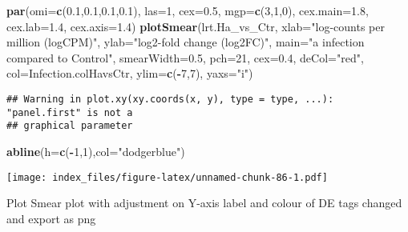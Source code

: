 \documentclass[
]{article}
\newenvironment{Shaded}{\begin{snugshade}}{\end{snugshade}}
\newcommand{\AttributeTok}[1]{\textcolor[rgb]{0.13,0.29,0.53}{#1}}
\newcommand{\DecValTok}[1]{\textcolor[rgb]{0.00,0.00,0.81}{#1}}
\newcommand{\FloatTok}[1]{\textcolor[rgb]{0.00,0.00,0.81}{#1}}
\newcommand{\FunctionTok}[1]{\textcolor[rgb]{0.13,0.29,0.53}{\textbf{#1}}}
\newcommand{\NormalTok}[1]{#1}
\newcommand{\SpecialCharTok}[1]{\textcolor[rgb]{0.81,0.36,0.00}{\textbf{#1}}}
\newcommand{\StringTok}[1]{\textcolor[rgb]{0.31,0.60,0.02}{#1}}
\begin{document}
\begin{Shaded}
\begin{Highlighting}[]
\FunctionTok{par}\NormalTok{(}\AttributeTok{omi=}\FunctionTok{c}\NormalTok{(}\FloatTok{0.1}\NormalTok{,}\FloatTok{0.1}\NormalTok{,}\FloatTok{0.1}\NormalTok{,}\FloatTok{0.1}\NormalTok{), }\AttributeTok{las=}\DecValTok{1}\NormalTok{, }\AttributeTok{cex=}\FloatTok{0.5}\NormalTok{, }\AttributeTok{mgp=}\FunctionTok{c}\NormalTok{(}\DecValTok{3}\NormalTok{,}\DecValTok{1}\NormalTok{,}\DecValTok{0}\NormalTok{), }\AttributeTok{cex.main=}\FloatTok{1.8}\NormalTok{, }\AttributeTok{cex.lab=}\FloatTok{1.4}\NormalTok{, }\AttributeTok{cex.axis=}\FloatTok{1.4}\NormalTok{)}
\FunctionTok{plotSmear}\NormalTok{(lrt.Ha\_vs\_Ctr, }\AttributeTok{xlab=}\StringTok{"log{-}counts per million (logCPM)"}\NormalTok{, }\AttributeTok{ylab=}\StringTok{"log2{-}fold change (log2FC)"}\NormalTok{, }\AttributeTok{main=}\StringTok{"a infection compared to Control"}\NormalTok{, }\AttributeTok{smearWidth=}\FloatTok{0.5}\NormalTok{, }\AttributeTok{pch=}\DecValTok{21}\NormalTok{, }\AttributeTok{cex=}\FloatTok{0.4}\NormalTok{, }\AttributeTok{deCol=}\StringTok{"red"}\NormalTok{, }\AttributeTok{col=}\NormalTok{Infection.colHavsCtr, }\AttributeTok{ylim=}\FunctionTok{c}\NormalTok{(}\SpecialCharTok{{-}}\DecValTok{7}\NormalTok{,}\DecValTok{7}\NormalTok{), }\AttributeTok{yaxs=}\StringTok{"i"}\NormalTok{)}
\end{Highlighting}
\end{Shaded}

\begin{verbatim}
## Warning in plot.xy(xy.coords(x, y), type = type, ...): "panel.first" is not a
## graphical parameter
\end{verbatim}

\begin{Shaded}
\begin{Highlighting}[]
\FunctionTok{abline}\NormalTok{(}\AttributeTok{h=}\FunctionTok{c}\NormalTok{(}\SpecialCharTok{{-}}\DecValTok{1}\NormalTok{,}\DecValTok{1}\NormalTok{),}\AttributeTok{col=}\StringTok{"dodgerblue"}\NormalTok{)}
\end{Highlighting}
\end{Shaded}

\texttt{[image: index\_files/figure-latex/unnamed-chunk-86-1.pdf]}

Plot Smear plot with adjustment on Y-axis label and colour of DE tags
changed and export as png
\end{document}
